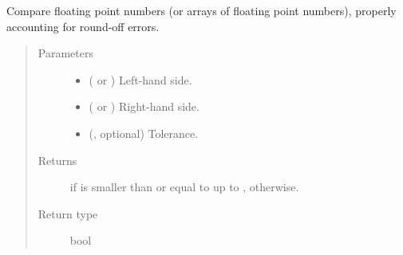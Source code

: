\documentclass[letterpaper,10pt,english]{sphinxmanual}
\begin{document}
\begin{fulllineitems}
\label{\detokenize{api:tasmania.utils.utils.smaller_or_equal_than}}
Compare floating point numbers (or arrays of floating point numbers), properly accounting for round-off errors.
\begin{quote}\begin{description}
\item[{Parameters}] \leavevmode\begin{itemize}
\item {} 
 ( or ) \textendash{} Left-hand side.

\item {} 
 ( or ) \textendash{} Right-hand side.

\item {} 
 (, optional) \textendash{} Tolerance.

\end{itemize}

\item[{Returns}] \leavevmode
{} if  is smaller than or equal to  up to ,  otherwise.

\item[{Return type}] \leavevmode
bool

\end{description}\end{quote}

\end{fulllineitems}

\end{document}
